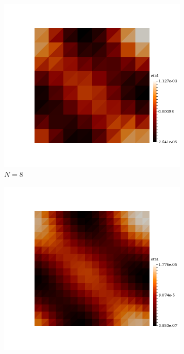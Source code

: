 \begin{figure}[h!]
  \centering
  \begin{subfigure}[b]{0.24\textwidth}
    \includegraphics[width=\textwidth,height=\textheight,keepaspectratio,height=\textheight,keepaspectratio]{figures/2_mpet/no_transfer/space/eta1_8.png}
    \caption{$N=8$}
  \end{subfigure}
  \begin{subfigure}[b]{0.24\textwidth}
    \includegraphics[width=\textwidth,height=\textheight,keepaspectratio,height=\textheight,keepaspectratio]{figures/2_mpet/no_transfer/space/eta1_16.png}

\end{subfigure}
\end{figure}
